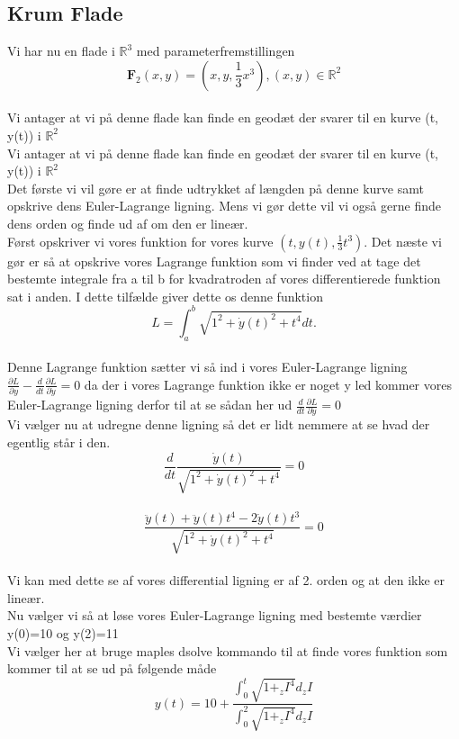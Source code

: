 \subsection{Krum Flade}
Vi har nu en flade i $\mathbb{R}^3$ med parameterfremstillingen \\
$$\textbf{F}_{2}(x,y)=(x, y, \frac{1}{3}x^3), (x,y) \in \mathbb{R}^2 $$\\
Vi antager at vi på denne flade kan finde en geodæt  der svarer til en kurve (t, y(t)) i $\mathbb{R}^2$ \\
Vi antager at vi på denne flade kan finde en geodæt  der svarer til en kurve (t, y(t)) i $\mathbb{R}^2$ \\
Det første vi vil gøre er at finde udtrykket af længden på denne kurve samt opskrive dens Euler-Lagrange ligning. Mens vi gør dette vil vi også gerne finde dens orden og finde ud af om den er lineær. \\
Først opskriver vi vores funktion for vores kurve $(t,y(t), \frac{1}{3} t^3)$. Det næste vi gør er så at opskrive vores Lagrange funktion som vi finder ved at tage det bestemte integrale fra a til b for kvadratroden af vores differentierede funktion sat i anden. I dette tilfælde giver dette os denne funktion \\
$$L=\int_{a}^{b} \sqrt{1^2+ \dot{y}(t)^2+t^4}dt. $$\\
Denne Lagrange funktion sætter vi så ind i vores Euler-Lagrange ligning $ \frac{ \partial L}{ \partial y}-  \frac{d}{dt} \frac{ \partial L}{ \partial \dot{y}}=0$ da der i vores Lagrange funktion ikke er noget y led kommer vores Euler-Lagrange ligning derfor til at se sådan her ud $ \frac{d}{dt} \frac{ \partial L}{ \partial \dot{y}}=0 $\\
Vi vælger nu at udregne denne ligning så det er lidt nemmere at se hvad der egentlig står i den. \\
$$ \frac{d}{dt} \frac{ \dot{y}(t)}{ \sqrt{1^2+ \dot{y}(t)^2+t^4}}=0  $$\\
$$ \frac{ \ddot{y}(t)+ \ddot{y}(t)t^4-2 \dot{y}(t)t^3}{\sqrt{1^2+ \dot{y}(t)^2+t^4}}=0 $$\\
Vi kan med dette se af vores differential ligning er af 2. orden og at den ikke er lineær. \\
Nu vælger vi så at løse vores Euler-Lagrange ligning med bestemte værdier y(0)=10 og y(2)=11 \\
Vi vælger her at bruge maples dsolve kommando til at finde vores funktion som kommer til at se ud på følgende måde \\
$$y(t)=10+ \frac{\int_{0}^{t}\sqrt{1+_zI^4}d_zI}{\int_{0}^{2}\sqrt{1+_zI^4}d_zI} $$ \\
